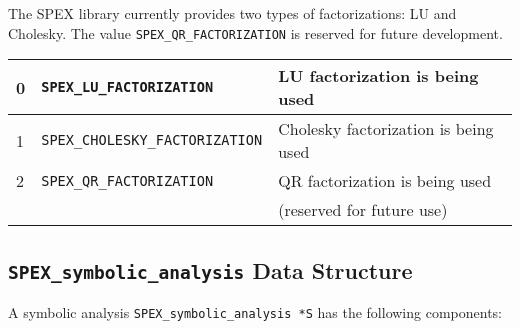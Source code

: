 \documentclass[12pt]{report}
\theoremstyle{definition}
\begin{document}
The SPEX library currently provides two types of factorizations: LU and Cholesky. The value
\verb|SPEX_QR_FACTORIZATION| is reserved for future development.

{\small
\begin{center}
\begin{tabular}{lll}
\hline
0 & \verb|SPEX_LU_FACTORIZATION|     & LU factorization is being used \\
\hline
1 & \verb|SPEX_CHOLESKY_FACTORIZATION|  & Cholesky factorization is being used\\
\hline
2 & \verb|SPEX_QR_FACTORIZATION|    & QR factorization is being used \\
                                    && (reserved for future use)\\
\hline
\end{tabular}
\label{tab:SPEX_factorizationkind}
\end{center}
}

\subsection{\texttt{SPEX\_symbolic\_analysis} Data Structure}
\label{ss:SPEX_symbolic_struct}

A symbolic analysis \verb|SPEX_symbolic_analysis *S| has the following components:
\end{document}
